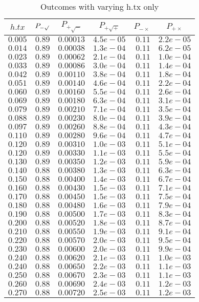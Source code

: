 %
\begin{table}[\hbtp]
 \small
 \begin{center}
 \begin{tabular}{rrrrrr}\hline\hline
\multicolumn{1}{c}{$h.tx$}&\multicolumn{1}{c}{$P_{-\surd}$}&\multicolumn{1}{c}{$P_{+\surd - }$}&\multicolumn{1}{c}{$P_{+\surd +}$}&\multicolumn{1}{c}{$P_{-\times}$}&\multicolumn{1}{c}{$P_{+\times}$}\tabularnewline
\hline
$0.005$&$0.89$&$0.00013$&$4.5e-05$&$0.11$&$2.2e-05$\tabularnewline
$0.014$&$0.89$&$0.00038$&$1.3e-04$&$0.11$&$6.2e-05$\tabularnewline
$0.023$&$0.89$&$0.00062$&$2.1e-04$&$0.11$&$1.0e-04$\tabularnewline
$0.033$&$0.89$&$0.00086$&$3.0e-04$&$0.11$&$1.4e-04$\tabularnewline
$0.042$&$0.89$&$0.00110$&$3.8e-04$&$0.11$&$1.8e-04$\tabularnewline
$0.051$&$0.89$&$0.00140$&$4.6e-04$&$0.11$&$2.2e-04$\tabularnewline
$0.060$&$0.89$&$0.00160$&$5.5e-04$&$0.11$&$2.6e-04$\tabularnewline
$0.069$&$0.89$&$0.00180$&$6.3e-04$&$0.11$&$3.1e-04$\tabularnewline
$0.079$&$0.89$&$0.00210$&$7.1e-04$&$0.11$&$3.5e-04$\tabularnewline
$0.088$&$0.89$&$0.00230$&$8.0e-04$&$0.11$&$3.9e-04$\tabularnewline
$0.097$&$0.89$&$0.00260$&$8.8e-04$&$0.11$&$4.3e-04$\tabularnewline
$0.110$&$0.89$&$0.00280$&$9.6e-04$&$0.11$&$4.7e-04$\tabularnewline
$0.120$&$0.89$&$0.00310$&$1.0e-03$&$0.11$&$5.1e-04$\tabularnewline
$0.120$&$0.89$&$0.00330$&$1.1e-03$&$0.11$&$5.5e-04$\tabularnewline
$0.130$&$0.89$&$0.00350$&$1.2e-03$&$0.11$&$5.9e-04$\tabularnewline
$0.140$&$0.88$&$0.00380$&$1.3e-03$&$0.11$&$6.3e-04$\tabularnewline
$0.150$&$0.88$&$0.00400$&$1.4e-03$&$0.11$&$6.7e-04$\tabularnewline
$0.160$&$0.88$&$0.00430$&$1.5e-03$&$0.11$&$7.1e-04$\tabularnewline
$0.170$&$0.88$&$0.00450$&$1.5e-03$&$0.11$&$7.5e-04$\tabularnewline
$0.180$&$0.88$&$0.00480$&$1.6e-03$&$0.11$&$7.9e-04$\tabularnewline
$0.190$&$0.88$&$0.00500$&$1.7e-03$&$0.11$&$8.3e-04$\tabularnewline
$0.200$&$0.88$&$0.00520$&$1.8e-03$&$0.11$&$8.7e-04$\tabularnewline
$0.210$&$0.88$&$0.00550$&$1.9e-03$&$0.11$&$9.1e-04$\tabularnewline
$0.220$&$0.88$&$0.00570$&$2.0e-03$&$0.11$&$9.5e-04$\tabularnewline
$0.230$&$0.88$&$0.00600$&$2.0e-03$&$0.11$&$9.9e-04$\tabularnewline
$0.240$&$0.88$&$0.00620$&$2.1e-03$&$0.11$&$1.0e-03$\tabularnewline
$0.240$&$0.88$&$0.00650$&$2.2e-03$&$0.11$&$1.1e-03$\tabularnewline
$0.250$&$0.88$&$0.00670$&$2.3e-03$&$0.11$&$1.1e-03$\tabularnewline
$0.260$&$0.88$&$0.00690$&$2.4e-03$&$0.11$&$1.2e-03$\tabularnewline
$0.270$&$0.88$&$0.00720$&$2.5e-03$&$0.11$&$1.2e-03$\tabularnewline
\hline
\end{tabular}

\end{center}

\caption{Outcomes with varying h.tx only\label{tbl:h.tx_varying_only}} 

\end{table}

